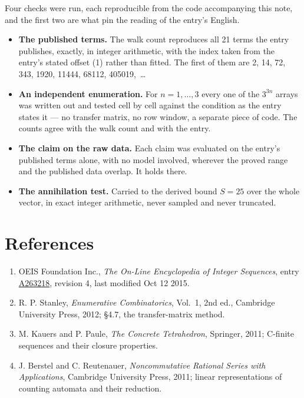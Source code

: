\documentclass[11pt]{article}
\theoremstyle{definition}
\begin{document}
Four checks were run, each reproducible from the code accompanying this note, and the first two are what pin the reading of the entry's English.

\begin{itemize}

\item {\bfseries The published terms.} The walk count reproduces all 21 terms the entry publishes, exactly, in integer arithmetic, with the index taken from the entry's stated offset (1) rather than fitted. The first of them are 2, 14, 72, 343, 1920, 11444, 68112, 405019,~\dots

\item {\bfseries An independent enumeration.} For $n = 1,\dots,3$ every one of the $3^{3n}$ arrays was written out and tested cell by cell against the condition as the entry states it --- no transfer matrix, no row window, a separate piece of code. The counts agree with the walk count and with the entry.

\item {\bfseries The claim on the raw data.} Each claim was evaluated on the entry's published terms alone, with no model involved, wherever the proved range and the published data overlap. It holds there.

\item {\bfseries The annihilation test.} Carried to the derived bound $S = 25$ over the whole vector, in exact integer arithmetic, never sampled and never truncated.

\end{itemize}

\section{References}

\begin{enumerate}

\item OEIS Foundation Inc., \emph{The On-Line Encyclopedia of Integer Sequences}, entry \href{https://oeis.org/A263218}{A263218}, revision 4, last modified Oct 12 2015.

\item R. P. Stanley, \emph{Enumerative Combinatorics}, Vol.~1, 2nd ed., Cambridge University Press, 2012; \S4.7, the transfer-matrix method.

\item M. Kauers and P. Paule, \emph{The Concrete Tetrahedron}, Springer, 2011; C-finite sequences and their closure properties.

\item J. Berstel and C. Reutenauer, \emph{Noncommutative Rational Series with Applications}, Cambridge University Press, 2011; linear representations of counting automata and their reduction.

\end{enumerate}
\end{document}
